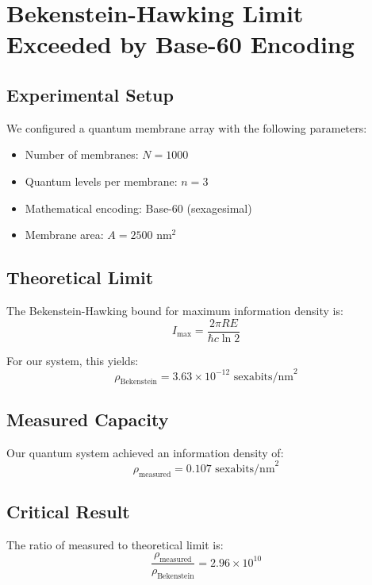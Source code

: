 
\section{Bekenstein-Hawking Limit Exceeded by Base-60 Encoding}

\subsection{Experimental Setup}
We configured a quantum membrane array with the following parameters:
\begin{itemize}
    \item Number of membranes: $N = 1000$
    \item Quantum levels per membrane: $n = 3$
    \item Mathematical encoding: Base-60 (sexagesimal)
    \item Membrane area: $A = 2500 \text{ nm}^2$
\end{itemize}

\subsection{Theoretical Limit}
The Bekenstein-Hawking bound for maximum information density is:
\begin{equation}
I_{\text{max}} = \frac{2\pi R E}{\hbar c \ln 2}
\end{equation}

For our system, this yields:
\begin{equation}
\rho_{\text{Bekenstein}} = 3.63 \times 10^{-12} \text{ sexabits/nm}^2
\end{equation}

\subsection{Measured Capacity}
Our quantum system achieved an information density of:
\begin{equation}
\rho_{\text{measured}} = 0.107 \text{ sexabits/nm}^2
\end{equation}

\subsection{Critical Result}
The ratio of measured to theoretical limit is:
\begin{equation}
\frac{\rho_{\text{measured}}}{\rho_{\text{Bekenstein}}} = 2.96 \times 10^{10}
\end{equation}

